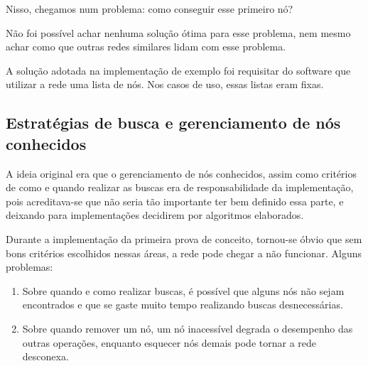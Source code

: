     Nisso, chegamos num problema: como conseguir esse primeiro nó?
    
    Não foi possível achar nenhuma solução ótima para esse problema, nem mesmo achar como que outras
    redes similares lidam com esse problema.
    
    A solução adotada na implementação de exemplo foi requisitar do software que utilizar a rede uma
    lista de nós. Nos casos de uso, essas listas eram fixas.
    
  \subsection{Estratégias de busca e gerenciamento de nós conhecidos}
    A ideia original era que o gerenciamento de nós conhecidos, assim como critérios de como e
    quando realizar as buscas era de responsabilidade da implementação, pois acreditava-se que não
    seria tão importante ter bem definido essa parte, e deixando para implementações decidirem
    por algoritmos elaborados.
    
    Durante a implementação da primeira prova de conceito, tornou-se óbvio que sem bons critérios
    escolhidos nessas áreas, a rede pode chegar a não funcionar. Alguns problemas:
    \begin{enumerate}
      \item Sobre quando e como realizar buscas, é possível que alguns nós não sejam encontrados e
        que se gaste muito tempo realizando buscas desnecessárias.
      \item Sobre quando remover um nó, um nó inacessível degrada o desempenho das outras operações,
        enquanto esquecer nós demais pode tornar a rede desconexa.
    \end{enumerate}